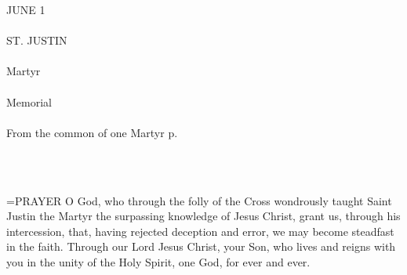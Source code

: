 \begin{center}\normalsize \begin{center}\normalsize JUNE 1\\\\
\footnotesize \footnotesize ST. JUSTIN\\\\
\footnotesize \footnotesize Martyr\\\\
\footnotesize \footnotesize Memorial\\\\
\footnotesize \footnotesize From the common of one Martyr p. \\\\
\footnotesize \end{center}\\
\end{center}

\hangindent=\parindent \small{PRAYER 
O God, who through the folly of the Cross
wondrously taught Saint Justin the Martyr
the surpassing knowledge of Jesus Christ,
grant us, through his intercession,
that, having rejected deception and error,
we may become steadfast in the faith.
Through our Lord Jesus Christ, your Son,
who lives and reigns with you in the unity of the Holy Spirit,
one God, for ever and ever.\\}
 
